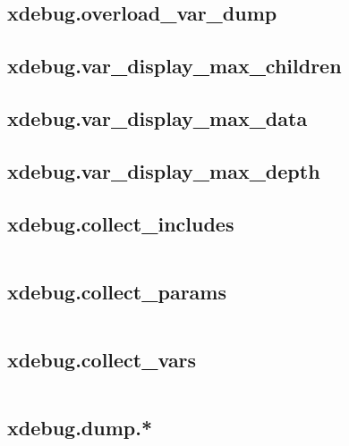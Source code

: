 \subsection{xdebug.overload\_var\_dump}



\subsection{xdebug.var\_display\_max\_children}



\subsection{xdebug.var\_display\_max\_data}



\subsection{xdebug.var\_display\_max\_depth}



\subsection{xdebug.collect\_includes}

\begin{lstlisting}[language=PHP]

\end{lstlisting}

\subsection{xdebug.collect\_params}




\begin{lstlisting}[language=PHP]

\end{lstlisting}

\subsection{xdebug.collect\_vars}


\begin{lstlisting}[language=PHP]

\end{lstlisting}

\subsection{xdebug.dump.*}


